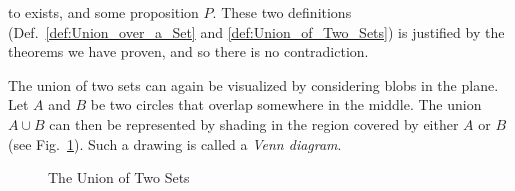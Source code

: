         to exists, and some proposition $P$. These two definitions
        (Def.~\ref{def:Union_over_a_Set} and \ref{def:Union_of_Two_Sets})
        is justified by the theorems we have proven, and so there is no
        contradiction.
        \par\hfill\par
        The union of two sets can again be visualized by considering blobs
        in the plane. Let $A$ and $B$ be two circles that overlap somewhere in
        the middle. The union $A\cup{B}$ can then be represented by shading in
        the region covered by either $A$ or $B$
        (see Fig.~\ref{fig:Union_of_Two_Sets}). Such a drawing is called a
        \textit{Venn diagram}.
        \begin{figure}[H]
            \centering
            \captionsetup{type=figure}
            
            \caption{The Union of Two Sets}
            \label{fig:Union_of_Two_Sets}
        \end{figure}
